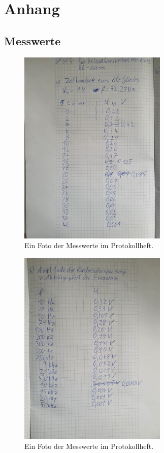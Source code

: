 \newpage
\section{Anhang}

    \subsection{Messwerte}
    \begin{figure}[H]
        \centering
        \includegraphics[width=0.63\textwidth]{latex/images/mess1.jpeg}
        \caption{Ein Foto der Messwerte im Protokollheft.}
        \label{img:mess1}
    \end{figure}

    \begin{figure}[H]
        \centering
        \includegraphics[width=0.63\textwidth]{latex/images/mess2.jpeg}
        \caption{Ein Foto der Messwerte im Protokollheft.}
        \label{img:mess2}
    \end{figure}


